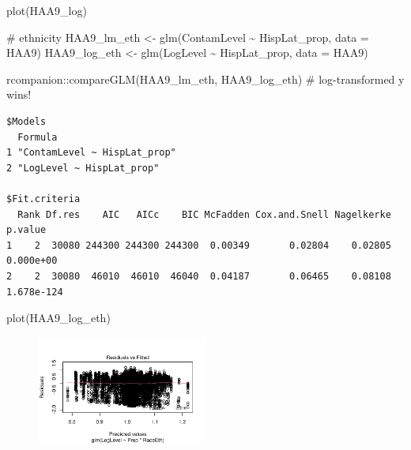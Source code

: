 \documentclass[
  letterpaper,
  DIV=11,
  numbers=noendperiod]{scrartcl}
\newenvironment{Shaded}{\begin{snugshade}}{\end{snugshade}}
\newcommand{\AttributeTok}[1]{\textcolor[rgb]{0.40,0.45,0.13}{#1}}
\newcommand{\CommentTok}[1]{\textcolor[rgb]{0.37,0.37,0.37}{#1}}
\newcommand{\FunctionTok}[1]{\textcolor[rgb]{0.28,0.35,0.67}{#1}}
\newcommand{\NormalTok}[1]{\textcolor[rgb]{0.00,0.23,0.31}{#1}}
\newcommand{\OtherTok}[1]{\textcolor[rgb]{0.00,0.23,0.31}{#1}}
\newcommand{\SpecialCharTok}[1]{\textcolor[rgb]{0.37,0.37,0.37}{#1}}
\begin{document}
\begin{Shaded}
\begin{Highlighting}[]
\FunctionTok{plot}\NormalTok{(HAA9\_log)}

\CommentTok{\# ethnicity}
\NormalTok{HAA9\_lm\_eth }\OtherTok{\textless{}{-}} \FunctionTok{glm}\NormalTok{(ContamLevel }\SpecialCharTok{\textasciitilde{}}\NormalTok{ HispLat\_prop, }\AttributeTok{data =}\NormalTok{ HAA9)}
\NormalTok{HAA9\_log\_eth }\OtherTok{\textless{}{-}} \FunctionTok{glm}\NormalTok{(LogLevel }\SpecialCharTok{\textasciitilde{}}\NormalTok{ HispLat\_prop, }\AttributeTok{data =}\NormalTok{ HAA9)}

\NormalTok{rcompanion}\SpecialCharTok{::}\FunctionTok{compareGLM}\NormalTok{(HAA9\_lm\_eth, HAA9\_log\_eth) }\CommentTok{\# log{-}transformed y wins!}
\end{Highlighting}
\end{Shaded}

\begin{verbatim}
$Models
  Formula                     
1 "ContamLevel ~ HispLat_prop"
2 "LogLevel ~ HispLat_prop"   

$Fit.criteria
  Rank Df.res    AIC   AICc    BIC McFadden Cox.and.Snell Nagelkerke    p.value
1    2  30080 244300 244300 244300  0.00349       0.02804    0.02805  0.000e+00
2    2  30080  46010  46010  46040  0.04187       0.06465    0.08108 1.678e-124
\end{verbatim}

\begin{Shaded}
\begin{Highlighting}[]
\FunctionTok{plot}\NormalTok{(HAA9\_log\_eth)}
\end{Highlighting}
\end{Shaded}

\begin{figure}[H]

{\centering \includegraphics[width=0.5\textwidth,height=\textheight]{appendix_files/figure-pdf/unnamed-chunk-6-1.pdf}

}

\end{figure}
\end{document}
